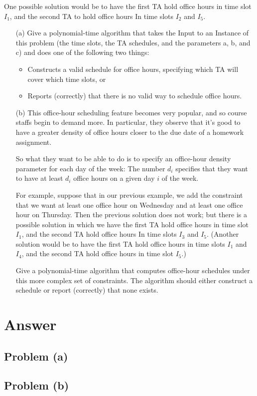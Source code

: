 \documentclass[12pt,letterpaper]{article}
\begin{document}
One possible solution would be to have the first TA hold office hours
in time slot $I_1$, and the second TA to hold office hours In time slots $I_2$
and $I_5$.
\begin{itemize}
\item[(a)] Give a polynomial-time algorithm that takes the Input to an Instance
of this problem (the time slots, the TA schedules, and the parameters
a, b, and c) and does one of the following two things:
\begin{itemize}
\item Constructs a valid schedule for office hours, specifying which
TA will cover which time slots, or
\item Reports (correctly) that there is no valid way to schedule office
hours.
\end{itemize}
\item[(b)] This office-hour scheduling feature becomes very popular, and so
course staffs begin to demand more. In particular, they observe that
it's good to have a greater density of office hours closer to the due
date of a homework assignment.

So what they want to be able to do is to specify an office-hour
density parameter for each day of the week: The number $d_i$ specifies
that they want to have at least $d_i$ office hours on a given day $i$ of the
week.

For example, suppose that in our previous example, we add the
constraint that we want at least one office hour on Wednesday and at
least one office hour on Thursday. Then the previous solution does
not work; but there is a possible solution in which we have the first
TA hold office hours in time slot $I_1$, and the second TA hold office
hours In time slots $I_3$ and $I_5$. (Another solution would be to have the
first TA hold office hours in time slots $I_1$ and $I_4$, and the second TA
hold office hours in time slot $I_5$.)

Give a polynomial-time algorithm that computes office-hour
schedules under this more complex set of constraints. The algorithm
should either construct a schedule or report (correctly) that
none exists.
\end{itemize}

\section*{Answer}
\subsection*{Problem (a)}

\subsection*{Problem (b)}
\end{document}
